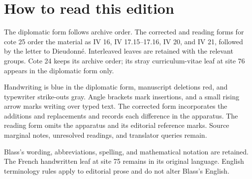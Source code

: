 \documentclass[10pt,a4paper]{article}
\begin{document}
\clearpage\section*{How to read this edition}
The diplomatic form follows archive order. The corrected and reading forms for cote 25 order the material as IV 16, IV 17.15--17.16, IV 20, and IV 21, followed by the letter to Dieudonné. Interleaved leaves are retained with the relevant groups. Cote 24 keeps its archive order; its stray curriculum-vitae leaf at site 76 appears in the diplomatic form only.

Handwriting is blue in the diplomatic form, manuscript deletions red, and typewriter strike-outs gray. Angle brackets mark insertions, and a small rising arrow marks writing over typed text. The corrected form incorporates the additions and replacements and records each difference in the apparatus. The reading form omits the apparatus and its editorial reference marks. Source marginal notes, unresolved readings, and translator queries remain.

Blass's wording, abbreviations, spelling, and mathematical notation are retained. The French handwritten leaf at site 75 remains in its original language. English terminology rules apply to editorial prose and do not alter Blass's English.
\end{document}
